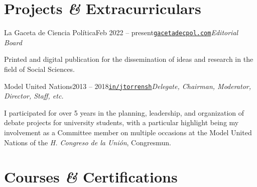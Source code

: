 \documentclass[letter]{resume}
\begin{document}
\section{Projects \textbf{\em\&} Extracurriculars} 

\begin{content}
\begin{position}{La Gaceta de Ciencia Política}{Feb 2022 -- present}{\normalfont\href{https://gacetadecpol.com/}{\texttt{gacetadecpol.com}}}{\emph{Editorial Board}}{}
  \item Printed and digital publication for the dissemination of ideas and research in the field of Social Sciences.
\end{position}

\begin{position}{Model United Nations}{2013 -- 2018}{\normalfont\href{https://www.linkedin.com/in/jtorrensh/}{\texttt{in/jtorrensh}}}{\emph{Delegate, Chairman, Moderator, Director, Staff, etc.}}{}
  \item I participated for over 5 years in the planning, leadership, and organization of debate projects for university students, with a particular highlight being my involvement as a Committee member on multiple occasions at the Model United Nations of the \emph{H. Congreso de la Unión}, Congresmun. 
\end{position}

\sectionlineskip
\end{content}


\section{Courses \textbf{\em\&} Certifications} 
\end{document}
